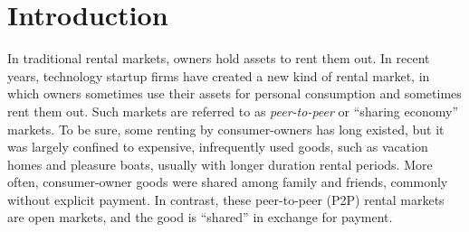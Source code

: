 \documentclass[11pt]{article}
\begin{document}

\section{Introduction}
In traditional rental markets, owners hold assets to rent them out.
In recent years, technology startup firms have created a new kind of rental market, in which owners sometimes use their assets for personal consumption and sometimes rent them out.
Such markets are referred to as \emph{peer-to-peer} or ``sharing economy'' markets.  
To be sure, some renting by consumer-owners has long existed, but it was largely confined to expensive, infrequently used goods, such as vacation homes and pleasure boats, usually with longer duration rental periods.
More often, consumer-owner goods were shared among family and friends, commonly without explicit payment.
In contrast, these peer-to-peer (P2P) rental markets are open markets, and the good is ``shared'' in exchange for payment. 
\end{document}

